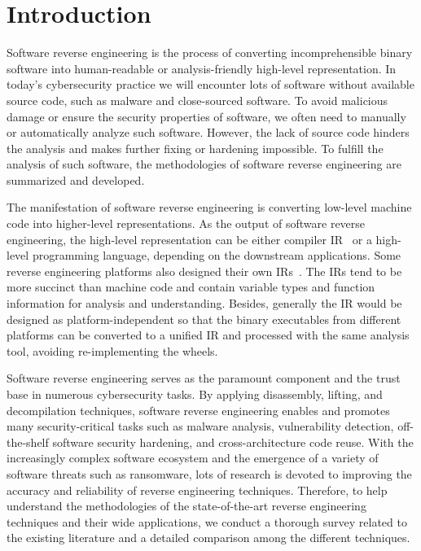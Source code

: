 \chapter{Introduction}\label{sec-introduction}


Software reverse engineering is the process of converting incomprehensible
binary software into human-readable or analysis-friendly high-level
representation. In today's cybersecurity practice we will encounter lots of
software without available source code, such as malware and close-sourced
software. To avoid malicious damage or ensure the security properties of
software, we often need to manually or automatically analyze such software.
However, the lack of source code hinders the analysis and makes further fixing
or hardening impossible.
To fulfill the analysis of such software, the methodologies of software reverse
engineering are summarized and developed.


The manifestation of software reverse engineering is converting low-level
machine code into higher-level representations. As the output of software
reverse engineering, the high-level representation can be either compiler
IR~\cite{llvm-ir} or a high-level programming language, depending on the
downstream applications. Some reverse engineering platforms also designed their
own IRs~\cite{vex-ir,bap-ir}. The IRs tend to be more succinct than
machine code and contain variable types and function information for analysis
and understanding. Besides, generally the IR would be designed as
platform-independent so that the binary executables from different platforms
can be converted to a unified IR and processed with the same analysis tool,
avoiding re-implementing the wheels.


Software reverse engineering serves as the paramount component and the trust
base in numerous cybersecurity tasks. By applying disassembly, lifting, and
decompilation techniques, software reverse engineering enables and promotes
many security-critical tasks such as malware analysis, vulnerability detection,
off-the-shelf software security hardening, and cross-architecture code reuse.
With the increasingly complex software ecosystem and the emergence of a variety
of software threats such as ransomware, lots of research is devoted to improving
the accuracy and reliability of reverse engineering techniques. Therefore, to
help understand the methodologies of the state-of-the-art reverse engineering
techniques and their wide applications, we conduct a thorough survey related to
the existing literature and a detailed comparison among the different techniques.

